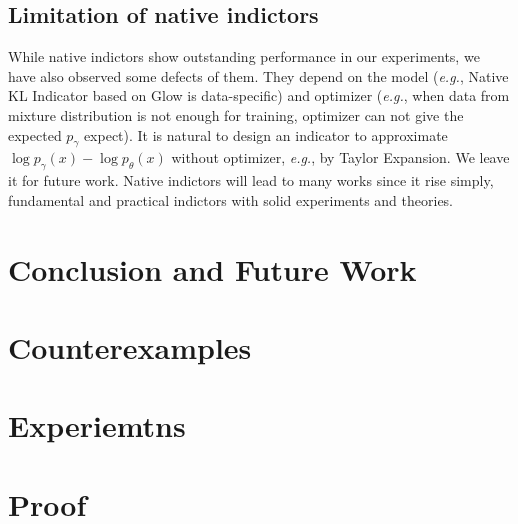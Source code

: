 \documentclass[letterpaper]{article} %
\newcommand{\EG}{\textit{e.g.}, }
\begin{document}
\subsection{Limitation of native indictors} 
While native indictors show outstanding performance in our experiments, we have also observed some defects of them. They depend on the model (\EG Native KL Indicator based on Glow is data-specific) and optimizer (\EG when data from mixture distribution is not enough for training, optimizer can not give the expected $p_\gamma$ expect). It is natural to design an indicator to approximate $\log p_\gamma(x) - \log p_\theta(x)$ without optimizer, \EG by Taylor Expansion. We leave it for future work. 
Native indictors will lead to many works since it rise simply, fundamental and practical indictors with solid experiments and theories. 

\section{Conclusion and Future Work}





\appendix
\section{Counterexamples}
\section{Experiemtns}
\section{Proof}
\end{document}

